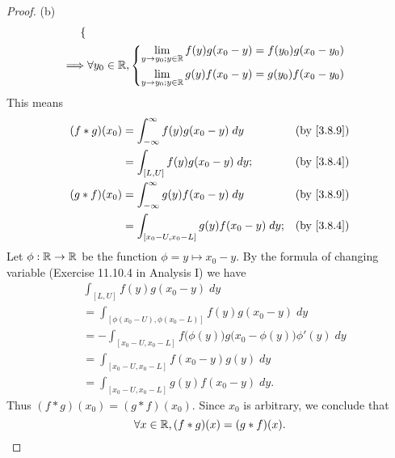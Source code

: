 \begin{proof}{(b)}
\begin{align*}
\begin{dcases}
                                   \end{dcases}             \\
    \implies & \forall y_0 \in \mathbb{R}, \begin{dcases}
                                     \lim_{y \to y_0 ; y \in \mathbb{R}} f(y) g(x_0 - y) = f(y_0) g(x_0 - y_0) \\
                                     \lim_{y \to y_0 ; y \in \mathbb{R}} g(y) f(x_0 - y) = g(y_0) f(x_0 - y_0)
                                   \end{dcases}
  \end{align*}
  This means
  \begin{align*}
    (f * g)(x_0) & = \int_{-\infty}^\infty f(y) g(x_0 - y) \; dy      &  & \by{3.8.9} \\
                 & = \int_{[L, U]} f(y) g(x_0 - y) \; dy;             &  & \by{3.8.4} \\
    (g * f)(x_0) & = \int_{-\infty}^\infty g(y) f(x_0 - y) \; dy      &  & \by{3.8.9} \\
                 & = \int_{[x_0 - U, x_0 - L]} g(y) f(x_0 - y) \; dy; &  & \by{3.8.4}
  \end{align*}
  Let \(\phi : \mathbb{R} \to \mathbb{R}\) be the function \(\phi = y \mapsto x_0 - y\).
  By the formula of changing variable (Exercise 11.10.4 in Analysis I) we have
  \begin{align*}
     & \int_{[L, U]} f(y) g(x_0 - y) \; dy                                                     \\
     & = \int_{[\phi(x_0 - U), \phi(x_0 - L)]} f(y) g(x_0 - y) \; dy                           \\
     & = -\int_{[x_0 - U, x_0 - L]} f\big(\phi(y)\big) g\big(x_0 - \phi(y)\big) \phi'(y) \; dy \\
     & = \int_{[x_0 - U, x_0 - L]} f(x_0 - y) g(y) \; dy                                       \\
     & = \int_{[x_0 - U, x_0 - L]} g(y) f(x_0 - y) \; dy.
  \end{align*}
  Thus \((f * g)(x_0) = (g * f)(x_0)\).
  Since \(x_0\) is arbitrary, we conclude that
  \[
    \forall x \in \mathbb{R}, (f * g)(x) = (g * f)(x).
  \]
\end{proof}

